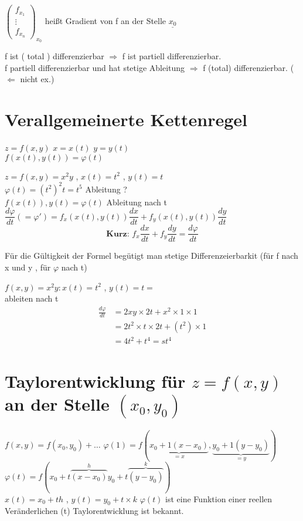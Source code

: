\begin{remark}
$\begin{pmatrix}
f_{x_1}\\
\vdots\\
f_{x_n}
\end{pmatrix}_{x_0}$ heißt Gradient von f an der Stelle $\underline{x_0}$
\end{remark}
\begin{remark}
f ist ( total ) differenzierbar $\Rightarrow$ f ist partiell differenzierbar.\\
f partiell differenzierbar und hat stetige Ableitung  $\Rightarrow$ f (total) differenzierbar. ($\Leftarrow$ nicht ex.)
\end{remark}
\section{Verallgemeinerte Kettenregel
}
$z = f(x ,y)$ $ x = x(t)  $ $ y = y(t)  $\\
$ f(x(t) , y(t) ) = \varphi(t) $
\begin{example}
$z= f(x,y)= x^2y$ ,  $x(t) = t^2 $
 , $y(t) = t$\\
$\varphi(t)=(t^2)^2 t = t^5 $ Ableitung ?\\
$f(x(t)) , y(t) = \varphi(t) $ Ableitung nach t\\
$\dfrac{d\varphi}{dt}(= \varphi') = f_x(x(t) , y(t)) \dfrac{dx}{dt} +
f_y(x(t) , y(t)) \dfrac{dy}{dt} $\\
\[\textbf{Kurz: } f_x \dfrac{dx}{dt} + f_y \dfrac{dy}{dt} = \dfrac{d \varphi}{dt}   \]
\end{example}
\begin{remark}
Für die Gültigkeit der Formel begütigt man stetige Differenzeierbarkit (für f nach x und y , für $\varphi$ nach t)  
\end{remark}
\begin{example}
$f(x,y)=x^2 y : x(t)=t^2$ , $y(t)=t = $\\
ableiten nach t 
\begin{align*}
\frac{d \varphi}{dt} &= 2xy \times 2t + x^2 \times 1 \times 1 \\
&=2t^2 \times t \times 2t + (t^2) \times 1\\
&= 4t^2 + t^4 = st^4
\end{align*}
\end{example}
\section{Taylorentwicklung für 
$ z = f (x, y)$ an der Stelle $(x_0, y_0)$}
$ f(x,y) = f( x_0 , y_0) + \dots $
$\varphi (1)  = f( \underbrace{ x_0 + 1 (x - x_0)}_{ = x}  , \underbrace{ y_0 +1 (y - y_0)}_{ = y} )$\\
$ \varphi(t) = f (x_0 + t \overbrace{( x - x_0 )}^{h} 
y_0 + t \overbrace{( y - y_0 )}^{k}) $\\
$x(t)=x_0 + th $ , $y(t)= y_0 +t \times k$
$\varphi(t)$ ist eine Funktion einer reellen Veränderlichen (t) Taylorentwicklung ist bekannt. 


